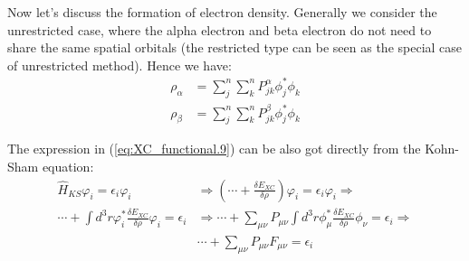 Now let's discuss the formation of electron density. Generally we
consider the unrestricted case, where the alpha electron and beta
electron do not need to share the same spatial orbitals (the
restricted type can be seen as the special case of unrestricted
method). Hence we have:
\begin{align}
  \label{eq:XC_functional.5}
  \rho_{\alpha} &=
  \sum_{j}^{n}\sum_{k}^{n}P^{\alpha}_{jk}\phi_{j}^{*}\phi_{k}
  \nonumber
  \\
  \rho_{\beta} &=
  \sum_{j}^{n}\sum_{k}^{n}P^{\beta}_{jk}\phi_{j}^{*}\phi_{k}
\end{align}

The expression in (\ref{eq:XC_functional.9}) can be also got directly
from the Kohn-Sham equation:
\begin{equation}
\begin{split}
  \hat{H}_{KS}\varphi_{i} = \epsilon_{i}\varphi_{i} &\Rightarrow
(\cdots + \frac{\delta E_{XC}}{\delta \rho})\varphi_{i} =
\epsilon_{i}\varphi_{i} \Rightarrow 
\nonumber \\
\cdots + \int d^{3}r \varphi^{*}_{i}\frac{\delta E_{XC}}{{\delta
\rho}}\varphi_{i} = \epsilon_{i} &\Rightarrow  
\cdots + \sum_{\mu\nu}P_{\mu\nu}\int d^{3}r
\phi^{*}_{\mu}\frac{\delta E_{XC}}{{\delta \rho}}\phi_{\nu}
= \epsilon_{i} \Rightarrow 
\nonumber \\
& \cdots + \sum_{\mu\nu}P_{\mu\nu}F_{\mu\nu} = \epsilon_{i}
\end{split}
\end{equation} 

